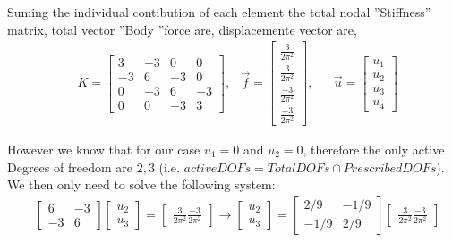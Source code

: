 \documentclass[a4paper]{memoir}
\begin{document}
Suming the individual contibution of each element the total nodal ''Stiffness'' matrix, total vector ''Body ''force are, displacemente vector are, 
\begin{align*}
	&K = 
	\begin{bmatrix}
	 3 & -3 &  0 &  0 \\
	-3 &  6 & -3 &  0 \\
	 0 & -3 &  6 & -3 \\
	 0 &  0 & -3 &  3 
	\end{bmatrix}, 
	&\vec{f} = 
	\begin{bmatrix}
	\frac{ 3}{2\pi^2} \\
	\frac{ 3}{2\pi^2} \\
	\frac{-3}{2\pi^2} \\
	\frac{-3}{2\pi^2}
	\end{bmatrix},&
	&\vec{u} = 
	\begin{bmatrix}
	u_1 \\
	u_2 \\
	u_3 \\
	u_4 
	\end{bmatrix}
\end{align*}

However we know that for our case $u_1 = 0$ and $u_2 = 0$, therefore the only active Degrees of freedom are ${2,3}$ (i.e. $activeDOFs = TotalDOFs \cap PrescribedDOFs$). We then only need to solve the following system: 
\begin{align*}
	&
	\begin{bmatrix}
		 6 & -3 \\
		-3 &  6
	\end{bmatrix}
	\begin{bmatrix}
		u_2 \\
		u_3
	\end{bmatrix}
	 = 
	\begin{bmatrix}
		\frac{ 3}{2\pi^2}
		\frac{-3}{2\pi^2}
	\end{bmatrix}
	\rightarrow
	\begin{bmatrix}
		u_2 \\
		u_3
	\end{bmatrix}
	=
	\begin{bmatrix}
		 2/9 & -1/9 \\
		-1/9 &  2/9
	\end{bmatrix}
	\begin{bmatrix}
		\frac{ 3}{2\pi^2}
		\frac{-3}{2\pi^2}
	\end{bmatrix}
\end{align*}
\end{document}
